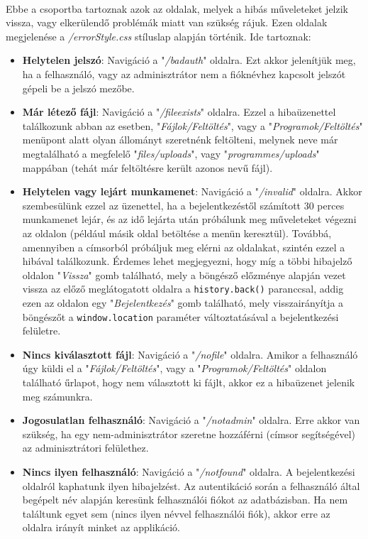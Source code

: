 \\

Ebbe a csoportba tartoznak azok az oldalak, melyek a hibás műveleteket jelzik vissza, vagy elkerülendő problémák miatt van szükség rájuk. Ezen oldalak megjelenése a \textit{/errorStyle.css} stíluslap alapján történik. Ide tartoznak:

\begin{itemize}
\item{\textbf{Helytelen jelszó}: Navigáció a "\textit{/badauth}" oldalra. Ezt akkor jelenítjük meg, ha a felhasználó, vagy az adminisztrátor nem a fióknévhez kapcsolt jelszót gépeli be a jelszó mezőbe.}
\item{\textbf{Már létező fájl}: Navigáció a "\textit{/fileexists}" oldalra. Ezzel a hibaüzenettel találkozunk abban az esetben, "\textit{Fájlok/Feltöltés}", vagy a "\textit{Programok/Feltöltés}" menüpont alatt olyan állományt szeretnénk feltölteni, melynek neve már megtalálható a megfelelő "\textit{files/uploads}", vagy "\textit{programmes/uploads}" mappában (tehát már feltöltésre került azonos nevű fájl).}
\item{\textbf{Helytelen vagy lejárt munkamenet}: Navigáció a "\textit{/invalid}" oldalra. Akkor szembesülünk ezzel az üzenettel, ha a bejelentkezéstől számított 30 perces munkamenet lejár, és az idő lejárta után próbálunk meg műveleteket végezni az oldalon (például másik oldal betöltése a menün keresztül). Továbbá, amennyiben a címsorból próbáljuk meg elérni az oldalakat, szintén ezzel a hibával találkozunk. Érdemes lehet megjegyezni, hogy míg a többi hibajelző oldalon "\textit{Vissza}" gomb található, mely a böngésző előzménye alapján vezet vissza az előző meglátogatott oldalra a \texttt{history.back()} paranccsal, addig ezen az oldalon egy "\textit{Bejelentkezés}" gomb található, mely visszairányítja a böngészőt a \texttt{window.location} paraméter változtatásával a bejelentkezési felületre.}
\item{\textbf{Nincs kiválasztott fájl}: Navigáció a "\textit{/nofile}" oldalra. Amikor a felhasználó úgy küldi el a "\textit{Fájlok/Feltöltés}", vagy a "\textit{Programok/Feltöltés}" oldalon található űrlapot, hogy nem választott ki fájlt, akkor ez a hibaüzenet jelenik meg számunkra.}
\item{\textbf{Jogosulatlan felhasználó}: Navigáció a "\textit{/notadmin}" oldalra. Erre akkor van szükség, ha egy nem-adminisztrátor szeretne hozzáférni (címsor segítségével) az adminisztrátori felülethez.}
\item{\textbf{Nincs ilyen felhasználó}: Navigáció a "\textit{/notfound}" oldalra. A bejelentkezési oldalról kaphatunk ilyen hibajelzést. Az autentikáció során a felhasználó által begépelt név alapján keresünk felhasználói fiókot az adatbázisban. Ha nem találtunk egyet sem (nincs ilyen névvel felhasználói fiók), akkor erre az oldalra irányít minket az applikáció.}

\end{itemize}

